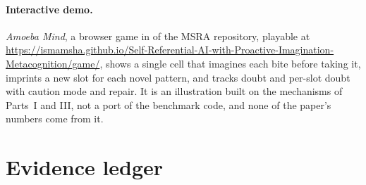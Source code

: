 \documentclass[11pt]{article}
\theoremstyle{remark}
\begin{document}
\paragraph{Interactive demo.} \emph{Amoeba Mind}, a browser game in  of the MSRA repository, playable at
\url{https://ismamsha.github.io/Self-Referential-AI-with-Proactive-Imagination-Metacognition/game/}, shows a single cell that imagines each bite before taking it, imprints a new slot for each novel
pattern, and tracks doubt and per-slot doubt with caution mode and repair. It is an illustration built on the
mechanisms of Parts~I and III, not a port of the benchmark code, and none of the paper's numbers come from it.




\appendix
\section{Evidence ledger}
\label{app:ledger}
\begingroup\small
\end{document}
